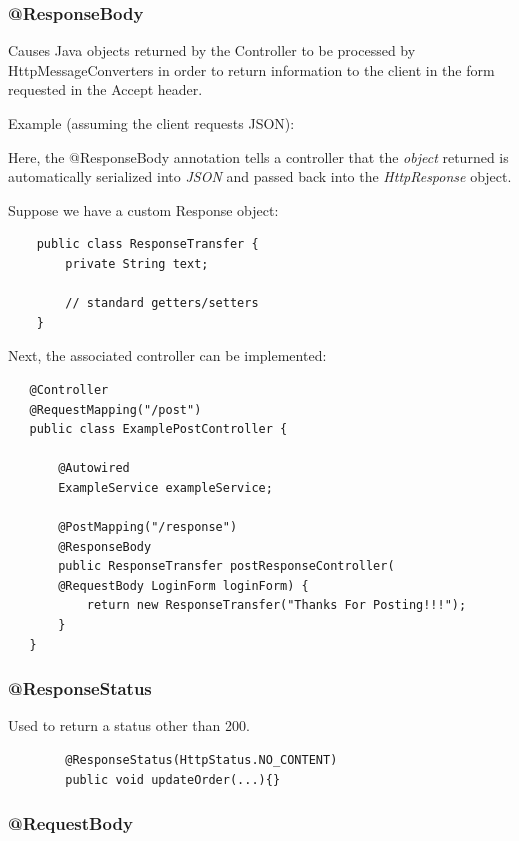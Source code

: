 \documentclass{scrartcl}
\begin{document}
\subsubsection{@ResponseBody}

Causes Java objects returned by the Controller to be processed by HttpMessageConverters in order to return information to the client in the form requested in the Accept header.

Example (assuming the client requests JSON):

Here, the @ResponseBody annotation tells a controller that the \textit{object} returned is automatically serialized into \textit{JSON} and passed back into the \textit{HttpResponse} object.

Suppose we have a custom Response object:

\begin{lstlisting}
    public class ResponseTransfer {
        private String text;

        // standard getters/setters
    }
\end{lstlisting}

Next, the associated controller can be implemented:

\begin{lstlisting}
   @Controller
   @RequestMapping("/post")
   public class ExamplePostController {

       @Autowired
       ExampleService exampleService;

       @PostMapping("/response")
       @ResponseBody
       public ResponseTransfer postResponseController(
       @RequestBody LoginForm loginForm) {
           return new ResponseTransfer("Thanks For Posting!!!");
       }
   }
\end{lstlisting}

\subsubsection{@ResponseStatus}

    Used to return a status other than 200.

    \begin{lstlisting}
        @ResponseStatus(HttpStatus.NO_CONTENT)
        public void updateOrder(...){}
    \end{lstlisting}

\subsubsection{@RequestBody}
\end{document}
